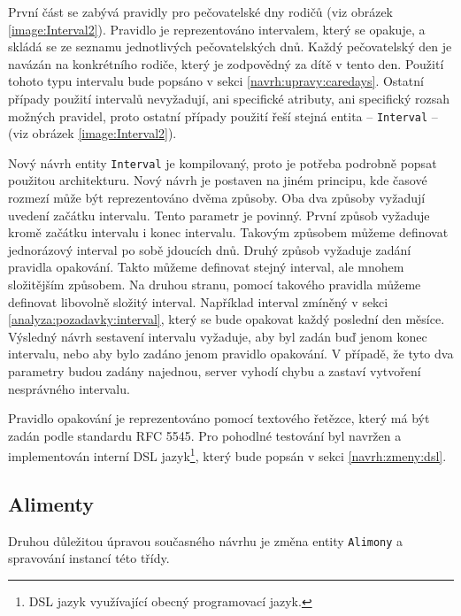         První část se zabývá pravidly pro pečovatelské dny rodičů (viz obrázek \ref{image:Interval2}). Pravidlo je reprezentováno intervalem, který se opakuje, a skládá se ze seznamu jednotlivých pečovatelských dnů. Každý pečovatelský den je navázán na konkrétního rodiče, který je zodpovědný za dítě v tento den. Použití tohoto typu intervalu bude popsáno v sekci \ref{navrh:upravy:caredays}. Ostatní případy použití intervalů nevyžadují, ani specifické atributy, ani specifický rozsah možných pravidel, proto ostatní případy použití řeší stejná entita -- \verb|Interval| -- (viz obrázek \ref{image:Interval2}).
        
    
        Nový návrh entity \verb|Interval| je kompilovaný, proto je potřeba podrobně popsat použitou architekturu. Nový návrh je postaven na jiném principu, kde časové rozmezí může být reprezentováno dvěma způsoby. Oba dva způsoby vyžadují uvedení začátku intervalu. Tento parametr je povinný. První způsob vyžaduje kromě začátku intervalu i konec intervalu. Takovým způsobem můžeme definovat jednorázový interval po sobě jdoucích dnů. Druhý způsob vyžaduje zadání pravidla opakování. Takto můžeme definovat stejný interval, ale mnohem složitějším způsobem. Na druhou stranu, pomocí takového pravidla můžeme definovat libovolně složitý interval. 
        Například interval zmíněný v sekci \ref{analyza:pozadavky:interval}, který se bude opakovat každý poslední den měsíce. Výsledný návrh sestavení intervalu vyžaduje, aby byl zadán buď jenom konec intervalu, nebo aby bylo zadáno jenom pravidlo opakování. V případě, že tyto dva parametry budou zadány najednou, server vyhodí chybu a zastaví vytvoření nesprávného intervalu.
    
        Pravidlo opakování je reprezentováno pomocí textového řetězce, který má být zadán podle standardu {RFC 5545}\cite{recurrence-rule}. Pro pohodlné testování byl navržen a implementován {interní DSL jazyk}\footnote{DSL jazyk využívající obecný programovací jazyk.}, který bude popsán v sekci \ref{navrh:zmeny:dsl}.
        
    \subsection{Alimenty}\label{navrh:upravy:alimenty}
        Druhou důležitou úpravou současného návrhu je změna entity \verb|Alimony| a spravování instancí této třídy.
    
